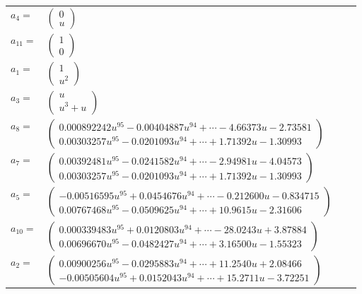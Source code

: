\documentclass[1p]{elsarticle_modified}
\theoremstyle{definition}
\begin{document}
\begin{tabular}{m{7pt} m{180pt} m{7pt} m{180pt} }
\flushright $a_{4}=$&$\begin{pmatrix}0\\u\end{pmatrix}$ \\
\flushright $a_{11}=$&$\begin{pmatrix}1\\0\end{pmatrix}$ \\
\flushright $a_{1}=$&$\begin{pmatrix}1\\u^2\end{pmatrix}$ \\
\flushright $a_{3}=$&$\begin{pmatrix}u\\u^3+u\end{pmatrix}$ \\
\flushright $a_{8}=$&$\begin{pmatrix}0.000892242 u^{95}-0.00404887 u^{94}+\cdots-4.66373 u-2.73581\\0.00303257 u^{95}-0.0201093 u^{94}+\cdots+1.71392 u-1.30993\end{pmatrix}$ \\
\flushright $a_{7}=$&$\begin{pmatrix}0.00392481 u^{95}-0.0241582 u^{94}+\cdots-2.94981 u-4.04573\\0.00303257 u^{95}-0.0201093 u^{94}+\cdots+1.71392 u-1.30993\end{pmatrix}$ \\
\flushright $a_{5}=$&$\begin{pmatrix}-0.00516595 u^{95}+0.0454676 u^{94}+\cdots-0.212600 u-0.834715\\0.00767468 u^{95}-0.0509625 u^{94}+\cdots+10.9615 u-2.31606\end{pmatrix}$ \\
\flushright $a_{10}=$&$\begin{pmatrix}0.000339483 u^{95}+0.0120803 u^{94}+\cdots-28.0243 u+3.87884\\0.00696670 u^{95}-0.0482427 u^{94}+\cdots+3.16500 u-1.55323\end{pmatrix}$ \\
\flushright $a_{2}=$&$\begin{pmatrix}0.00900256 u^{95}-0.0295883 u^{94}+\cdots+11.2540 u+2.08466\\-0.00505604 u^{95}+0.0152043 u^{94}+\cdots+15.2711 u-3.72251\end{pmatrix}$ \\

\end{tabular}
\end{document}
